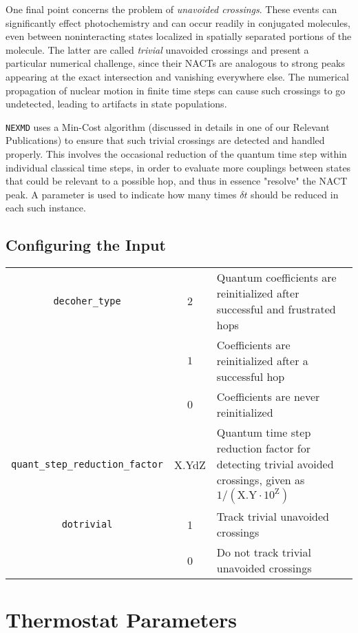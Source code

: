 \documentclass[12pt,letter,footinclude=true,headinclude=true,hyphens,oneside]{book} %
\begin{document}
    One final point concerns the problem of \emph{unavoided crossings}. These events can significantly effect photochemistry and can occur readily in conjugated molecules, even between noninteracting states localized in spatially separated portions of the molecule. The latter are called \emph{trivial} unavoided crossings and present a particular numerical challenge, since their NACTs are analogous to strong peaks appearing at the exact intersection and vanishing everywhere else. The numerical propagation of nuclear motion in finite time steps can cause such crossings to go undetected, leading to artifacts in state populations.
    
    \texttt{NEXMD} uses a Min-Cost algorithm (discussed in details in one of our Relevant Publications) to ensure that such trivial crossings are detected and handled properly. This involves the occasional reduction of the quantum time step within individual classical time steps, in order to evaluate more couplings between states that could be relevant to a possible hop, and thus in essence "resolve" the NACT peak. A parameter is used to indicate how many times $\delta t$ should be reduced in each such instance.
    
    \subsection{Configuring the Input}
    \label{na-input}
    
    \begin{tabular}{ | c | c | p{7cm} | }
    \hline
    \texttt{decoher\_type} & $2$ & Quantum coefficients are reinitialized after successful and frustrated hops \\
    & $1$ & Coefficients are reinitialized after a successful hop \\
    & $0$ & Coefficients are never reinitialized \\ \hline
    \texttt{quant\_step\_reduction\_factor} & X.YdZ & Quantum time step reduction factor for detecting trivial avoided crossings, given as $1/ (\textrm{X.Y} \cdot 10^{\textrm{Z}})$ \\ \hline
        \texttt{dotrivial} & 1 & Track trivial unavoided crossings \\
        & 0 & Do not track trivial unavoided crossings \\ \hline
    \end{tabular}
    
    \section{Thermostat Parameters}
    
\end{document}
